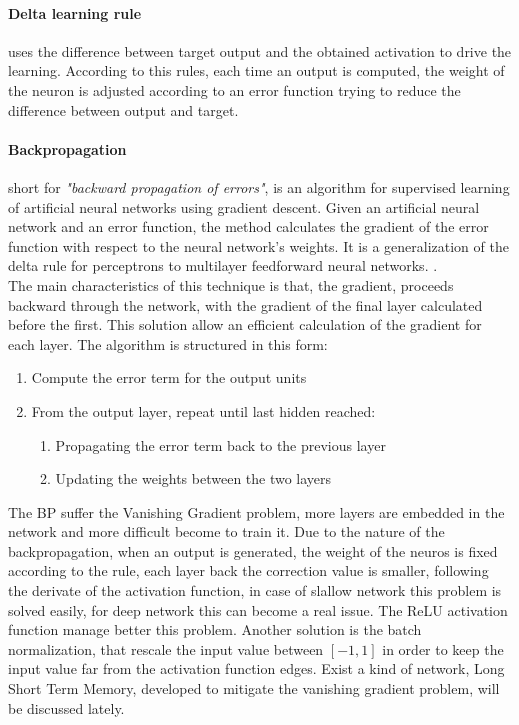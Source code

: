 \documentclass[%
    corpo=12pt,
    twoside,
    oldstyle,
    autoretitolo,
    greek,
    evenboxes,
]{toptesi}
\begin{document}
\paragraph{Delta learning rule} uses the difference between target output and the obtained activation to drive the learning. According to this rules, each time an output is computed, the weight of the neuron is adjusted according to an error function trying to reduce the difference between output and target.

\paragraph{Backpropagation} short for \textit{"backward propagation of errors"}, is an algorithm for supervised learning of artificial neural networks using gradient descent. Given an artificial neural network and an error function, the method calculates the gradient of the error function with respect to the neural network's weights. It is a generalization of the delta rule for perceptrons to multilayer feedforward neural networks. \cite{bp}.\\
The main characteristics of this technique is that, the gradient, proceeds backward through the network, with the gradient of the final layer calculated before the first. This solution allow an efficient calculation of the gradient for each layer. The algorithm is structured in this form:
\begin{enumerate}
  \item Compute the error term for the output units
  \item From the output layer, repeat until last hidden reached:
  \begin{enumerate}
    \item Propagating the error term back to the previous layer
    \item Updating the weights between the two layers
  \end{enumerate}
\end{enumerate}
The BP suffer the Vanishing Gradient problem, more layers are embedded in the network and more difficult become to train it. Due to the nature of the backpropagation, when an output is generated, the weight of the neuros is fixed according to the rule, each layer back the correction value is smaller, following the derivate of the activation function, in case of slallow network this problem is solved easily, for deep network this can become a real issue. The ReLU activation function manage better this problem. Another solution is the batch normalization, that rescale the input value between $[-1,1]$ in order to keep the input value far from the activation function edges. Exist a kind of network, Long Short Term Memory, developed to mitigate the vanishing gradient problem, will be discussed lately.
\end{document}
